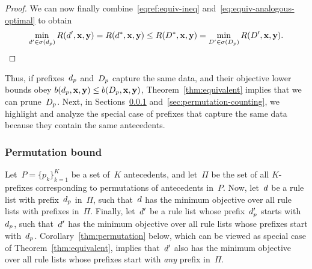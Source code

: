 \begin{arxiv}
\begin{proof}
We can now finally combine~\eqref{eqref:equiv-ineq}
and~\eqref{eq:equiv-analogous-optimal} to obtain
\begin{align}
\min_{{d}' \in \sigma(d_p)} R({d}', \mathbf{x}, \mathbf{y})
= R({d}^*, \mathbf{x}, \mathbf{y}) \le R({D}^*, \mathbf{x}, \mathbf{y})
= \min_{{D}' \in \sigma(D_p)} R({D}', \mathbf{x}, \mathbf{y}).
\end{align}
\end{proof}
\end{arxiv}

Thus, if prefixes~$d_p$ and~$D_p$ capture the same data,
and their objective lower bounds obey
${b(d_p, \mathbf{x}, \mathbf{y}) \le b(D_p, \mathbf{x}, \mathbf{y})}$,
Theorem~\ref{thm:equivalent} implies that we can prune~$D_p$.
%
%
Next, in Sections~\ref{sec:permutation} and~\ref{sec:permutation-counting},
we highlight and analyze the special case of prefixes that capture
the same data because they contain the same antecedents.

\subsubsection{Permutation bound}%
\label{sec:permutation}

Let~${P = \{p_k\}_{k=1}^K}$ be a set of~$K$ antecedents,
and let~$\Pi$ be the set of all $K$-prefixes corresponding to
permutations of antecedents in~$P$.
%
Now, let~${d}$ be a rule list with prefix~$d_p$ in~$\Pi$,
such that~${d}$ has the minimum objective over all rule lists
with prefixes in~$\Pi$.
%
Finally, let~${d}'$ be a rule list whose prefix~$d_p'$
starts with~$d_p$, such that~${d}'$ has the minimum objective
over all rule lists whose prefixes start with~$d_p$.
%
Corollary~\ref{thm:permutation} below,
which can be viewed as special case of Theorem~\ref{thm:equivalent},
implies that~${d}'$ also has the minimum objective over all
rule lists whose prefixes start with \emph{any} prefix in~$\Pi$.

